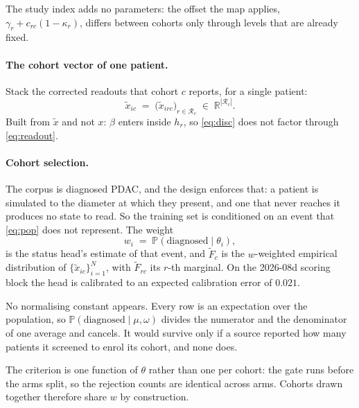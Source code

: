 \documentclass[11pt]{article}
\newcommand{\Rset}{\mathcal{R}}
\begin{document}
The study index adds no parameters: the offset the map applies,
$\gamma_r + c_{rc}(1-\kappa_r)$, differs between cohorts only through levels that
are already fixed.

\paragraph{The cohort vector of one patient.} Stack the corrected readouts that
cohort $c$ reports, for a single patient:
\begin{equation}
\tilde x_{ic} \;=\; \big(\tilde x_{irc}\big)_{r\in\Rset_c}
\;\in\; \mathbb{R}^{|\Rset_c|} .
\label{eq:stack}
\end{equation}
Built from $\tilde x$ and not $x$: $\beta$ enters inside $h_r$, so
\eqref{eq:disc} does not factor through \eqref{eq:readout}.

\paragraph{Cohort selection.} The corpus is diagnosed PDAC, and the design
enforces that: a patient is simulated to the diameter at which they present, and
one that never reaches it produces no state to read. So the training set is
conditioned on an event that \eqref{eq:pop} does not represent. The weight
\begin{equation}
w_i \;=\; \mathbb{P}(\text{diagnosed}\mid\theta_i),
\label{eq:elig}
\end{equation}
is the status head's estimate of that event, and $\tilde F_{c}$ is the
$w$-weighted empirical distribution of $\{\tilde x_{ic}\}_{i=1}^N$, with
$\tilde F_{rc}$ its $r$-th marginal. On the 2026-08d scoring block the head is
calibrated to an expected calibration error of $0.021$.

No normalising constant appears. Every row is an expectation over the population,
so $\mathbb{P}(\text{diagnosed}\mid\mu,\omega)$ divides the numerator and the
denominator of one average and cancels. It would survive only if a source
reported how many patients it screened to enrol its cohort, and none does.

The criterion is one function of $\theta$ rather than one per cohort: the gate
runs before the arms split, so the rejection counts are identical across arms.
Cohorts drawn together therefore share $w$ by construction.
\end{document}

